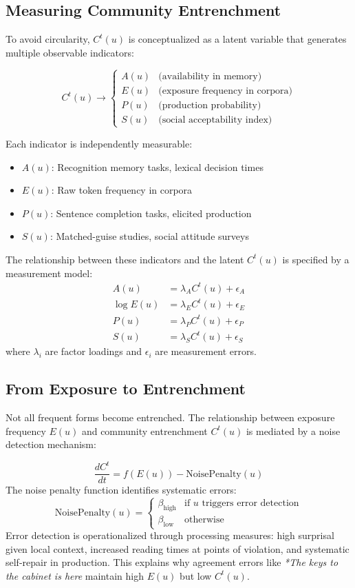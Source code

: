 \documentclass[12pt,letterpaper]{article}
\begin{document}
\subsection{Measuring Community Entrenchment}

To avoid circularity, $C^t(u)$ is conceptualized as a latent variable that generates multiple observable indicators:

\[
C^t(u) \rightarrow \begin{cases}
A(u) & \text{(availability in memory)} \\
E(u) & \text{(exposure frequency in corpora)} \\
P(u) & \text{(production probability)} \\
S(u) & \text{(social acceptability index)}
\end{cases}
\]

Each indicator is independently measurable:
\begin{itemize}
    \item $A(u)$: Recognition memory tasks, lexical decision times
    \item $E(u)$: Raw token frequency in corpora
    \item $P(u)$: Sentence completion tasks, elicited production
    \item $S(u)$: Matched-guise studies, social attitude surveys
\end{itemize}

The relationship between these indicators and the latent $C^t(u)$ is specified by a measurement model:
\[
\begin{aligned}
A(u) &= \lambda_A C^t(u) + \epsilon_A \\
\log E(u) &= \lambda_E C^t(u) + \epsilon_E \\
P(u) &= \lambda_P C^t(u) + \epsilon_P \\
S(u) &= \lambda_S C^t(u) + \epsilon_S
\end{aligned}
\]
where $\lambda_i$ are factor loadings and $\epsilon_i$ are measurement errors.

\subsection{From Exposure to Entrenchment}

Not all frequent forms become entrenched. The relationship between exposure frequency $E(u)$ and community entrenchment $C^t(u)$ is mediated by a noise detection mechanism:

\[
\frac{dC^t}{dt} = f(E(u)) - \text{NoisePenalty}(u)
\]
The noise penalty function identifies systematic errors:
\[
\text{NoisePenalty}(u) = \begin{cases}
\beta_{\text{high}} & \text{if } u \text{ triggers error detection} \\
\beta_{\text{low}} & \text{otherwise}
\end{cases}
\]
Error detection is operationalized through processing measures: high surprisal given local context, increased reading times at points of violation, and systematic self-repair in production. This explains why agreement errors like \textit{*The keys to the cabinet is here} maintain high $E(u)$ but low $C^t(u)$.
\end{document}
